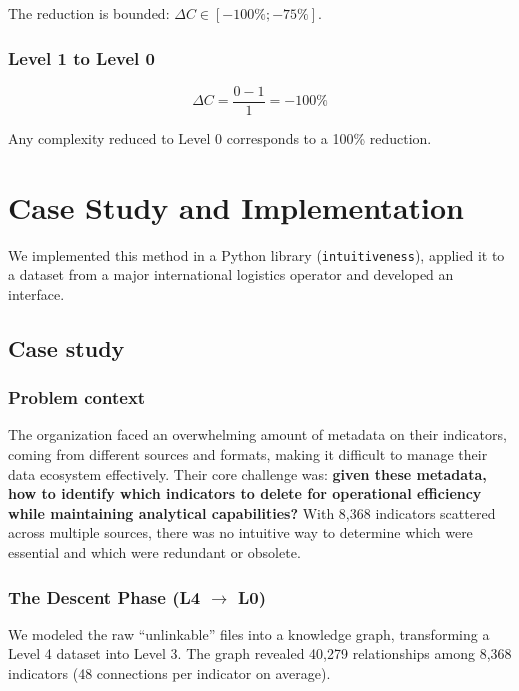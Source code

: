 \documentclass[Afour,times,sageh]{sagej}
\begin{document}
The reduction is bounded: $\Delta C \in [-100\%; -75\%]$.

\subsubsection{Level 1 to Level 0}
\begin{equation}
\Delta C = \frac{0 - 1}{1} = -100\%
\end{equation}

Any complexity reduced to Level 0 corresponds to a 100\% reduction.

\section{Case Study and Implementation}
\label{sec:case-study}


We implemented this method in a Python library (\texttt{intuitiveness}), applied it to a dataset from a major international logistics operator and developed an interface. 

\subsection{Case study}

\subsubsection{Problem context}
The organization faced an overwhelming amount of metadata on their indicators, coming from different sources and formats, making it difficult to manage their data ecosystem effectively. Their core challenge was: \textbf{given these metadata, how to identify which indicators to delete for operational efficiency while maintaining analytical capabilities?} With 8,368 indicators scattered across multiple sources, there was no intuitive way to determine which were essential and which were redundant or obsolete.

\subsubsection{The Descent Phase (L4 $\to$ L0)}

\vspace{1em}

We modeled the raw ``unlinkable'' files into a knowledge graph, transforming a Level 4 dataset into Level 3. The graph revealed 40,279 relationships among 8,368 indicators (48 connections per indicator on average).
\end{document}
